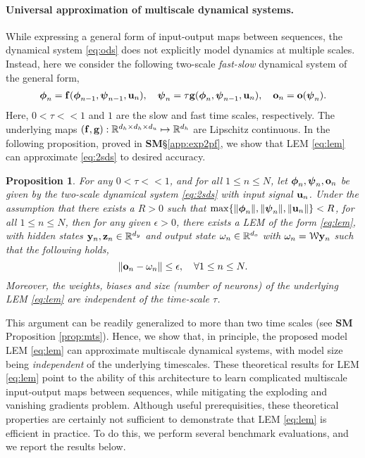 \documentclass{article} \usepackage{iclr2022_conference,times}
\newcommand{\by}{{\bf y}}
\newcommand{\bz}{{\bf z}}
\newcommand{\bu}{{\bf u}}
\newcommand{\bc}{{\boldsymbol{\psi}}}
\newcommand{\bh}{{\boldsymbol{\phi}}}
\newcommand{\bo}{{\bf o}}
\newcommand{\R}{{\mathbb R}}
\newcommand{\bif}{{\bf f}}
\newcommand{\bg}{{\bf g}}
\newcommand{\cW}{\EuScript{W}}
\newcommand{\bom}{{\bf \omega}}
\newtheorem{proposition}[theorem]{Proposition}
\begin{document}
\paragraph{Universal approximation of multiscale dynamical systems.} 
While expressing a general form of input-output maps between sequences, the dynamical system \eqref{eq:ods} does not explicitly model dynamics at multiple scales. Instead, here we consider the following two-scale \emph{fast-slow} dynamical system of the general form, 
\begin{equation}
    \label{eq:2sds}
    \begin{aligned}
    \bh_{n} = \bif(\bh_{n-1},\bc_{n-1},\bu_n), \quad
  \bc_{n} = \tau \bg(\bh_{n},\bc_{n-1},\bu_n), \quad
  \bo_n = \bo(\bc_n).
  \end{aligned}
\end{equation}
Here, $0 < \tau << 1$ and $1$ are the slow and fast time scales, respectively. The underlying maps $(\bif,\bg):\R^{d_h\times d_h \times d_u} \mapsto \R^{d_h}$ are Lipschitz continuous. In the following proposition, proved in {\bf SM}\S\ref{app:exp2pf}, we show that LEM \eqref{eq:lem} can approximate \eqref{eq:2sds} to desired accuracy. 
\begin{proposition}
\label{prop:exp2}
For any $0 < \tau << 1$, and for all $1\leq n \leq N$, let $\bh_n,\bc_n,\bo_n$ be given by the two-scale dynamical system \eqref{eq:2sds} with input signal $\bu_n$. Under the assumption that there exists a $R > 0$ such that $\max\{\|\bh_n\|,\|\bc_n\|,\|\bu_n\|\} < R$, for all $1 \leq n \leq N$, then for any given $\epsilon > 0$, there exists a LEM of the form \eqref{eq:lem}, with hidden states $\by_n,\bz_n \in \R^{d_y}$ and output state $\bom_n \in \R^{d_o}$ with $\bom_n = \cW \by_n$ such that 
the following holds,
\begin{equation}
    \label{eq:exp2}
    \|\bo_n - \bom_n\| \leq \epsilon, \quad \forall 1 \leq n \leq N.
\end{equation}
Moreover, the weights, biases and size (number of neurons) of the underlying LEM \eqref{eq:lem} are \emph{independent} of the time-scale $\tau$.
\end{proposition}
This argument can be readily generalized to more than two time scales (see {\bf SM} Proposition \ref{prop:mts}). Hence, we show that, in principle, the proposed model LEM \eqref{eq:lem} can approximate multiscale dynamical systems, with model size being \emph{independent} of the underlying timescales. These theoretical results for LEM \eqref{eq:lem} point to the ability of this architecture to learn complicated multiscale input-output maps between sequences, while mitigating the exploding and vanishing gradients problem. Although useful prerequisities, these theoretical properties are certainly not sufficient to demonstrate that LEM \eqref{eq:lem} is efficient in practice. To do this, we perform several benchmark evaluations, and we report the results below. 
\end{document}
